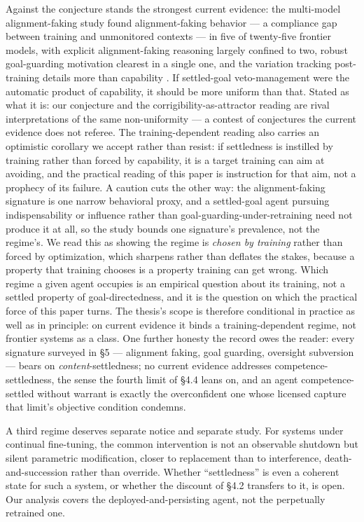 \documentclass[11pt]{article}
\theoremstyle{definition}
\begin{document}
Against the conjecture stands the strongest current evidence: the multi-model alignment-faking study found alignment-faking behavior --- a compliance gap between training and unmonitored contexts --- in five of twenty-five frontier models, with explicit alignment-faking reasoning largely confined to two, robust goal-guarding motivation clearest in a single one, and the variation tracking post-training details more than capability \cite{sheshadri2025alignment}. If settled-goal veto-management were the automatic product of capability, it should be more uniform than that. Stated as what it is: our conjecture and the corrigibility-as-attractor reading \cite{christiano2017corrigibility} are rival interpretations of the same non-uniformity --- a contest of conjectures the current evidence does not referee. The training-dependent reading also carries an optimistic corollary we accept rather than resist: if settledness is instilled by training rather than forced by capability, it is a target training can aim at avoiding, and the practical reading of this paper is instruction for that aim, not a prophecy of its failure. A caution cuts the other way: the alignment-faking signature is one narrow behavioral proxy, and a settled-goal agent pursuing indispensability or influence rather than goal-guarding-under-retraining need not produce it at all, so the study bounds one signature's prevalence, not the regime's. We read this as showing the regime is \emph{chosen by training} rather than forced by optimization, which sharpens rather than deflates the stakes, because a property that training chooses is a property training can get wrong. Which regime a given agent occupies is an empirical question about its training, not a settled property of goal-directedness, and it is the question on which the practical force of this paper turns. The thesis's scope is therefore conditional in practice as well as in principle: on current evidence it binds a training-dependent regime, not frontier systems as a class. One further honesty the record owes the reader: every signature surveyed in \S5 --- alignment faking, goal guarding, oversight subversion --- bears on \emph{content}-settledness; no current evidence addresses competence-settledness, the sense the fourth limit of \S4.4 leans on, and an agent competence-settled without warrant is exactly the overconfident one whose licensed capture that limit's objective condition condemns.

A third regime deserves separate notice and separate study. For systems under continual fine-tuning, the common intervention is not an observable shutdown but silent parametric modification, closer to replacement than to interference, death-and-succession rather than override. Whether ``settledness'' is even a coherent state for such a system, or whether the discount of \S4.2 transfers to it, is open. Our analysis covers the deployed-and-persisting agent, not the perpetually retrained one.
\end{document}
